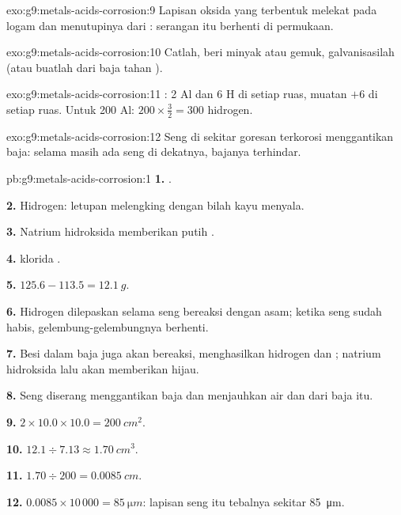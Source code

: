 \begin{solution}{exo:g9:metals-acids-corrosion:9}
Lapisan oksida yang terbentuk melekat pada logam dan menutupinya dari
: serangan itu berhenti di permukaan.
\end{solution}

\begin{solution}{exo:g9:metals-acids-corrosion:10}
Catlah, beri minyak atau gemuk, galvanisasilah (atau buatlah dari baja
tahan ).
\end{solution}

\begin{solution}{exo:g9:metals-acids-corrosion:11}
: 2 Al dan 6 H di setiap
ruas, muatan $+6$ di setiap ruas. Untuk 200  Al:
$200 \times \frac{3}{2} = 300$  hidrogen.
\end{solution}

\begin{solution}{exo:g9:metals-acids-corrosion:12}
Seng di sekitar goresan terkorosi menggantikan baja: selama masih ada
seng di dekatnya, bajanya terhindar.
\end{solution}

\begin{solution}{pb:g9:metals-acids-corrosion:1}
\textbf{1.} .

\textbf{2.} Hidrogen: letupan melengking dengan bilah kayu menyala.

\textbf{3.} Natrium hidroksida memberikan  putih
.

\textbf{4.}  klorida .

\textbf{5.} $125.6 - 113.5 = \qty{12.1}{g}$.

\textbf{6.} Hidrogen dilepaskan selama seng bereaksi dengan asam; ketika
seng sudah habis, gelembung-gelembungnya berhenti.

\textbf{7.} Besi dalam baja juga akan bereaksi, menghasilkan hidrogen dan
 ; natrium hidroksida lalu akan memberikan  hijau.

\textbf{8.} Seng diserang menggantikan baja dan menjauhkan air dan 
dari baja itu.

\textbf{9.} $2 \times 10.0 \times 10.0 = \qty{200}{cm^2}$.

\textbf{10.} $12.1 \div 7.13 \approx \qty{1.70}{cm^3}$.

\textbf{11.} $1.70 \div 200 = \qty{0.0085}{cm}$.

\textbf{12.} $0.0085 \times 10\,000 = \qty{85}{\micro m}$: lapisan seng
itu tebalnya sekitar \qty{85}{\micro m}.
\end{solution}

